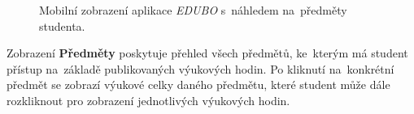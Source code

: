 \documentclass[male,czech,api_bc]{kitheses}
\begin{document}
\begin{figure}[H]
	\centering
	\caption{Mobilní zobrazení aplikace \textit{EDUBO} s~náhledem na~předměty studenta.}
	\label{fig:edubo-6}
\end{figure}

Zobrazení \textbf{Předměty} poskytuje přehled všech předmětů, ke~kterým má student přístup na~základě publikovaných výukových hodin. Po kliknutí na~konkrétní předmět se zobrazí výukové celky daného předmětu, které student může dále rozkliknout pro zobrazení jednotlivých výukových hodin.
\end{document}
